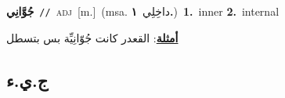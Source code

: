 \documentclass[10pt,a4paper,twoside]{article} %
\begin{document}
\begin{multicols}{2}
{\setlength\topsep{0pt}\textbf{\foreignlanguage{arabic}{جُوَّانِي}}\ {\color{gray}\texttt{//}\color{black}}\ \textsc{adj}\ [m.]\ \color{gray}(msa. \foreignlanguage{arabic}{داخِلِي}~\foreignlanguage{arabic}{\textbf{١.}})\color{black}\ \textbf{1.}~inner  \textbf{2.}~internal\  \begin{flushright}\color{gray}\foreignlanguage{arabic}{\textbf{\underline{\foreignlanguage{arabic}{أمثلة}}}: القعدر كانت جُوّانِيِّة بس بتسطل}\end{flushright}\color{black}} \vspace{2mm}

\vspace{-3mm}
\subsection*{\color{blue}\foreignlanguage{arabic}{ج.ي.ء}\color{blue}{}} 


\end{multicols}
\end{document}
